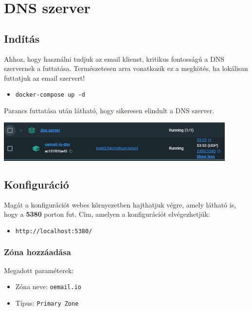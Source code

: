 ﻿\graphicspath{ {./assets/} }

\chapter{DNS szerver}

\section{Indítás}
Ahhoz, hogy használni tudjuk az email klienst, kritikus fontosságú a DNS szervernek a futtatása. Természetesen arra vonatkozik ez a megkötés, ha lokálisan futtatjuk az email szervert!
\begin{itemize}
    \item \verb|docker-compose up -d|
\end{itemize}

\begin{flushleft}
    Parancs futtatása után látható, hogy sikeresen elindult a DNS szerver.
    \begin{center}
        \includegraphics[width=0.9\textwidth]{docker-up-dns-server.png}
    \end{center}
\end{flushleft}

\section{Konfiguráció}
\begin{flushleft}
    Magát a konfigurációt webes környezetben hajthatjuk végre, amely látható is, hogy a \textbf{5380} porton fut. Cím, amelyen a konfigurációt elvégezhetjük:
    \begin{itemize}
        \item \verb|http://localhost:5380/|
    \end{itemize}
\end{flushleft}

\subsection{Zóna hozzáadása}
Megadott paraméterek:
\begin{itemize}
    \item Zóna neve: \verb|oemail.io|
    \item Típus: \verb|Primary Zone|
\end{itemize}

